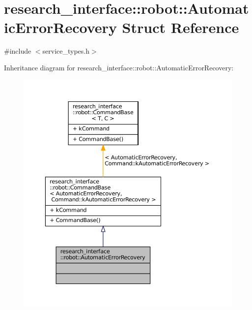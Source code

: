 \hypertarget{structresearch__interface_1_1robot_1_1AutomaticErrorRecovery}{}\section{research\+\_\+interface\+:\+:robot\+:\+:Automatic\+Error\+Recovery Struct Reference}
\label{structresearch__interface_1_1robot_1_1AutomaticErrorRecovery}


{\ttfamily \#include $<$service\+\_\+types.\+h$>$}



Inheritance diagram for research\+\_\+interface\+:\+:robot\+:\+:Automatic\+Error\+Recovery\+:
\nopagebreak
\begin{figure}[H]
\begin{center}
\leavevmode
\includegraphics[width=350pt]{structresearch__interface_1_1robot_1_1AutomaticErrorRecovery__inherit__graph}
\end{center}
\end{figure}


